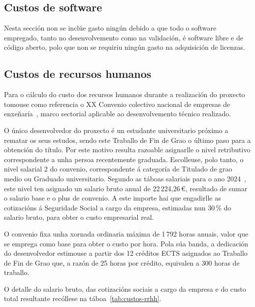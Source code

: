 \subsection{Custos de software}
Nesta sección non se inclúe gasto ningún debido a que todo o software empregado,
tanto no desenvolvemento como na validación, é software libre e de código aberto, polo que non se
requiriu ningún gasto na adquisición de licenzas.


\subsection{Custos de recursos humanos}
Para o cálculo do custo dos recursos humanos durante a realización do proxecto tomouse
como referencia o XX Convenio colectivo nacional de empresas de enxeñaría~\cite{xxconvenio},
marco sectorial aplicable ao desenvolvemento técnico realizado.

O único desenvolvedor do proxecto é un estudante universitario próximo a rematar os seus
estudos, sendo este Traballo de Fin de Grao o último paso para a obtención do título.
Por este motivo resulta razoable asignarlle o nivel retributivo correspondente a unha
persoa recentemente graduada. Escolleuse, polo tanto, o nivel
salarial 2 do convenio, correspondente á categoría de Titulado de grao medio ou Graduado
universitario. Segundo as táboas salariais para o ano 2024~\cite{xxconveniotablas2024},
este nivel ten asignado un salario bruto anual de 22\,224,26\,€, resultado de sumar o
salario base e o plus de convenio. A este importe hai que engadirlle as cotizacións á
Seguridade Social a cargo da empresa, estimadas nun 30\,\% do salario bruto, para obter
o custo empresarial real.

O convenio fixa unha xornada ordinaria máxima de 1\,792 horas anuais, valor que se
emprega como base para obter o custo por hora. Pola súa banda, a dedicación do
desenvolvedor estimouse a partir dos 12 créditos ECTS asignados ao Traballo de Fin de
Grao que, a razón de 25 horas por crédito, equivalen a 300 horas de traballo.

O detalle do salario bruto, das cotizacións sociais a cargo da empresa e do custo total
resultante recóllese na táboa~\ref{tab:custos-rrhh}.

